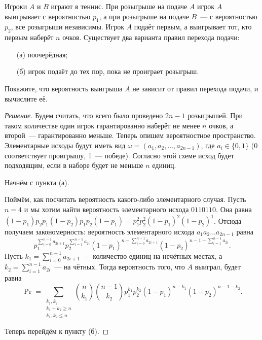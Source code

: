 \begin{problem}
    Игроки \(A\) и \(B\) играют в теннис. При розыгрыше на подаче \(A\) игрок \(A\) выигрывает с вероятностью \(p_1\), а при розыгрыше на подаче \(B\)~--- с вероятностью \(p_2\), все розыгрыши независимы. Игрок \(A\) подаёт первым, а выигрывает тот, кто первым наберёт \(n\) очков. Существует два варианта правил перехода подачи:
    \begin{itemize}
        \item[(а)] поочерёдная;
        \item[(б)] игрок подаёт до тех пор, пока не проиграет розыгрыш.
    \end{itemize}
    Покажите, что вероятность выигрыша \(A\) не зависит от правил перехода подачи, и вычислите её.
\end{problem}
\begin{proof}[Решение]
    Будем считать, что всего было проведено \(2n - 1\) розыгрышей. При таком количестве один игрок гарантированно наберёт не менее \(n\) очков, а второй~--- гарантированно меньше. Теперь опишем вероятностное пространство. Элементарные исходы будут иметь вид \(\omega = (a_1, a_2, \ldots, a_{2n - 1})\), где \(a_i \in \{0, 1\}\) (0 соответствует проигрышу, 1~--- победе). Согласно этой схеме исход будет подходящим, если в наборе будет не меньше \(n\) единиц.
    
    Начнём с пункта (а).
    
    Поймём, как посчитать вероятность какого-либо элементарного случая. Пусть \(n = 4\) и мы хотим найти вероятность элементарного исхода \(0110110\). Она равна \((1 - p_1)p_2p_1(1 - p_2)p_1p_2(1 - p_1) = p_{1}^{2}p_{2}^{2}(1 - p_{1})^{2}(1 - p_2)^{1}\). Отсюда получаем закономерность: вероятность элементарного исхода \(a_{1}a_{2}\ldots a_{2n - 1}\) равна \[p_{1}^{\sum\limits_{i = 0}^{n - 1} a_{2i + 1}}p_{2}^{\sum\limits_{i = 1}^{n - 1} a_{2i}}(1 - p_{1})^{n - \sum\limits_{i = 0}^{n - 1} a_{2i + 1}}(1 - p_{2})^{n - 1 - \sum\limits_{i = 1}^{n - 1} a_{2i}}.\]
    Пусть \(k_{1} = \sum\limits_{i = 0}^{n - 1} a_{2i + 1}\)~--- количество единиц на нечётных местах, а \(k_{2} = \sum\limits_{i = 1}^{n - 1} a_{2i}\)~--- на чётных. Тогда вероятность того, что \(A\) выиграл, будет равна
    \[\Pr = \sum\limits_{\substack{k_1, k_2 \\ k_1 + k_2 \geq n \\ k_1, k_2 \leq n}}\binom{n}{k_1}\binom{n - 1}{k_2}p_{1}^{k_1}p_{2}^{k_2}(1 - p_{1})^{n - k_1}(1 - p_{2})^{n - 1 - k_2}.\]
    
    Теперь перейдём к пункту (б).
    

\end{proof}
